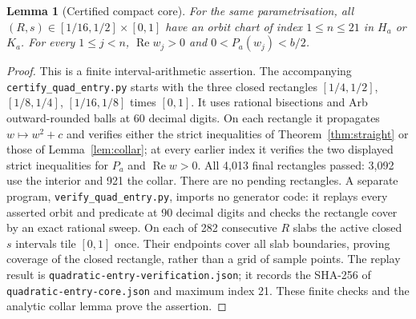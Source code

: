 \documentclass[11pt]{article}
\newtheorem{lemma}[theorem]{Lemma}
\newcommand{\re}{\operatorname{Re}}
\begin{document}
\begin{lemma}[Certified compact core]\label{lem:core}
For the same parametrisation, all $(R,s)\in[1/16,1/2]\times[0,1]$ have
an orbit chart of index $1\le n\le21$ in $H_a$ or $K_a$. For every
$1\le j<n$, $\re w_j>0$ and $0<P_a(w_j)<b/2$.
\end{lemma}
\begin{proof}
This is a finite interval-arithmetic assertion. The accompanying
\texttt{certify\_quad\_entry.py} starts with the three closed rectangles
$[1/4,1/2]$, $[1/8,1/4]$, $[1/16,1/8]$ times $[0,1]$.
It uses rational bisections and Arb outward-rounded balls at 60 decimal
digits. On each rectangle it propagates $w\mapsto w^2+c$ and verifies
either the strict inequalities of Theorem~\ref{thm:straight} or those of
Lemma~\ref{lem:collar}; at every earlier index it verifies the two
displayed strict inequalities for $P_a$ and $\re w>0$.
All 4,013 final rectangles passed: 3,092 use the interior and 921 the
collar. There are no pending rectangles. A separate program,
\texttt{verify\_quad\_entry.py}, imports no generator code: it replays
every asserted orbit and predicate at 90 decimal digits and checks the
rectangle cover by an exact rational sweep. On each of 282 consecutive
$R$ slabs the active closed $s$ intervals tile $[0,1]$ once. Their
endpoints cover all slab boundaries, proving coverage of the closed
rectangle, rather than a grid of sample points.
The replay result is \texttt{quadratic-entry-verification.json}; it
records the SHA-256 of \texttt{quadratic-entry-core.json} and maximum
index 21. These finite checks and the analytic collar lemma prove the
assertion.
\end{proof}
\end{document}
